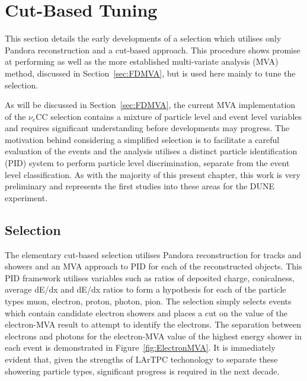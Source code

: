 \section{Cut-Based Tuning}\label{sec:FDCut}

This section details the early developments of a selection which utilises only Pandora reconstruction and a cut-based approach.  This procedure shows promise at performing as well as the more established multi-variate analysis (MVA) method, discussed in Section~\ref{sec:FDMVA}, but is used here mainly to tune the selection.

As will be discussed in Section~\ref{sec:FDMVA}, the current MVA implementation of the $\nu_e$CC selection contains a mixture of particle level and event level variables and requires significant understanding before developments may progress.  The motivation behind considering a simplified selection is to facilitate a careful evaluation of the events and the analysis utilises a distinct particle identification (PID) system to perform particle level discrimination, separate from the event level classification.  As with the majority of this present chapter, this work is very preliminary and represents the first studies into these areas for the DUNE experiment.

\subsection{Selection}\label{sec:FDCutSelection}

The elementary cut-based selection utilises Pandora reconstruction for tracks and showers and an MVA approach to PID for each of the reconstructed objects.  This PID framework \cite{GrantPID2016} utilises variables such as ratios of deposited charge, conicalness, average dE/dx and dE/dx ratios to form a hypothesis for each of the particle types muon, electron, proton, photon, pion.  The selection simply selects events which contain candidate electron showers and places a cut on the value of the electron-MVA result to attempt to identify the electrons.  The separation between electrons and photons for the electron-MVA value of the highest energy shower in each event is demonstrated in Figure~\ref{fig:ElectronMVA}.  It is immediately evident that, given the strengths of LArTPC techonology to separate these showering particle types, significant progress is required in the next decade.

